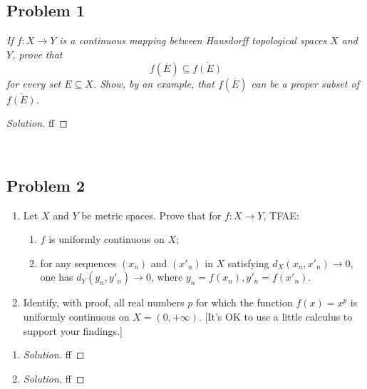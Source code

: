 \documentclass{article}
\begin{document}
\subsection*{Problem 1}
{\it If $f \colon X \to Y$ is a continuous mapping between
Hausdorff topological spaces $X$ and $Y$,
prove that
\[
	f(\overline{E}) \subseteq \overline{f(E)}
\]
for every set $E \subseteq X$.
Show, by an example, that $f(\overline{E})$ can be a proper subset of $\overline{f(E)}$.}

\begin{proof}[Solution]\let\qed\relax
	ff
\end{proof}
\clearpage
~\clearpage

\subsection*{Problem 2}
{\it
\begin{enumerate}
	\item Let $X$ and $Y$ be metric spaces. Prove that for $f \colon X \to Y$, TFAE:
	\begin{enumerate}
		\item $f$ is uniformly continuous on $X$;
		\item for any sequences $(x_n)$ and $(x'_n)$ in $X$
			satisfying $d_X(x_n,x'_n) \to 0$,
			one has $d_Y(y_n,y'_n) \to 0$, where $y_n = f(x_n), y'_n=f(x'_n)$.
	\end{enumerate}
	\item Identify, with proof, all real numbers $p$ for which the function
		$f(x) = x^p$ is uniformly continuous on $X = (0,+\infty)$.
		[It's OK to use a little calculus to support your findings.]
\end{enumerate}}


\begin{enumerate}
	\item \begin{proof}[Solution]\let\qed\relax
		ff
	\end{proof}
	\item \begin{proof}[Solution]\let\qed\relax
		ff
	\end{proof}
\end{enumerate}
\clearpage
~\clearpage
\end{document}
